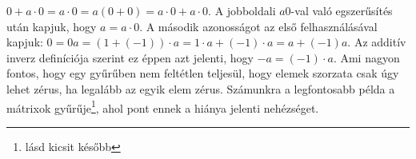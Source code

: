 \documentclass[9pt,showtrims]{memoir}
\makeatletter
\renewenvironment{proof}[1][\proofname]
    {\par\pushQED{\qed}%
    \normalfont \topsep6\p@\@plus6\p@\relax
    \trivlist
    \item[\hskip\labelsep
        \itshape
    #1\@addpunct{:}]\ignorespaces}
    {\popQED\endtrivlist\@endpefalse}
\theoremstyle{plain}
\theoremstyle{remark}
\theoremstyle{definition}
\makeatother
\begin{document}
\begin{proof}
    \begin{math}
        0+a\cdot 0=
        a\cdot 0=
        a\left( 0+0 \right)=
        a\cdot 0+a\cdot 0.
    \end{math}
    A jobboldali $a0$-val való egszerűsítés után kapjuk, 
    hogy $a=a\cdot0$.
    A második azonosságot az első felhasználásával kapjuk:
    \begin{math}
        0
        =
        0a
        =
        \left( 1+\left( -1 \right) \right)\cdot a
        =
        1\cdot a + \left( -1 \right)\cdot a
        =
        a +\left( -1 \right)a.
    \end{math}
    Az additív inverz definíciója szerint ez éppen azt jelenti, hogy $-a=\left( -1 \right)\cdot a$.
\end{proof}
Ami nagyon fontos, hogy egy gyűrűben nem feltétlen teljesül, 
hogy elemek szorzata csak úgy lehet zérus, ha legalább az egyik elem zérus.
Számunkra a legfontosabb példa  a mátrixok gyűrűje\footnote{lásd kicsit később},
ahol pont ennek a hiánya jelenti nehézséget.
\end{document}
